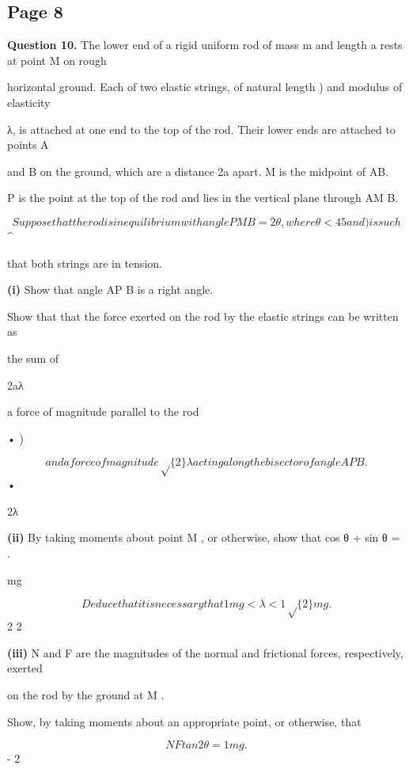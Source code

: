 \documentclass[12pt]{article}
\begin{document}
\subsection*{Page 8}
\begin{flushleft}
\bigskip\textbf{Question 10.} The lower end of a rigid uniform rod of mass m and length a rests at point M on rough\par
horizontal ground. Each of two elastic strings, of natural length ) and modulus of elasticity\par
λ, is attached at one end to the top of the rod. Their lower ends are attached to points A\par
and B on the ground, which are a distance 2a apart. M is the midpoint of AB.\par
P is the point at the top of the rod and lies in the vertical plane through AM B.\par
\[Suppose that the rod is in equilibrium with angle P M B = 2θ, where θ < 45 and ) is such\]
\textasciicircum{}\circ\par
that both strings are in tension.\par
\textbf{(i)} Show that angle AP B is a right angle.\par
Show that that the force exerted on the rod by the elastic strings can be written as\par
the sum of\par
2aλ\par
a force of magnitude parallel to the rod\par
• )\par
\[and a force of magnitude \sqrt\{2\} λ acting along the bisector of angle AP B.\]
•\par
2λ\par
\textbf{(ii)} By taking moments about point M , or otherwise, show that cos θ + sin θ = .\par
mg\par
\[Deduce that it is necessary that 1 mg < λ < 1 \sqrt\{2\} mg.\]
2 2\par
\textbf{(iii)} N and F are the magnitudes of the normal and frictional forces, respectively, exerted\par
on the rod by the ground at M .\par
Show, by taking moments about an appropriate point, or otherwise, that\par
\[N F tan 2θ = 1 mg.\]
- 2\par
\end{flushleft}
\end{document}
